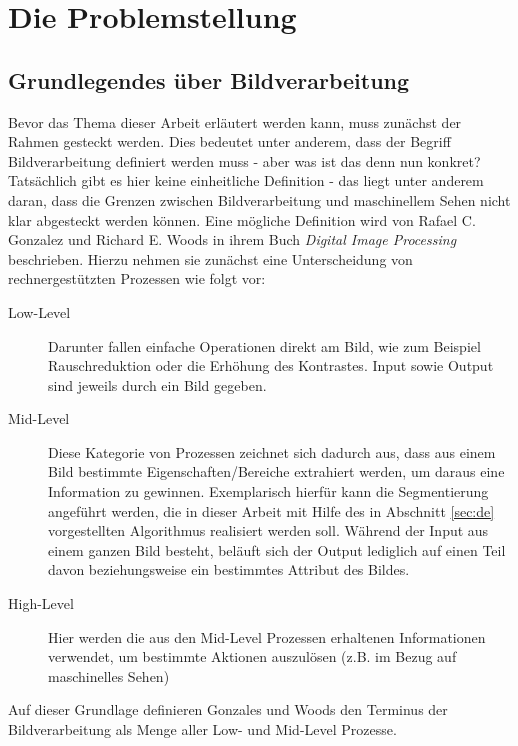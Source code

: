 \chapter{Die Problemstellung}
\label{sec:prob}
	
	\section{Grundlegendes über Bildverarbeitung}
	\label{sec:bild-basics}
	
	Bevor das Thema dieser Arbeit erläutert werden kann, muss zunächst der Rahmen gesteckt werden. Dies bedeutet unter anderem, dass der Begriff Bildverarbeitung definiert werden muss - aber was ist das denn nun konkret? Tatsächlich gibt es hier keine einheitliche Definition - das liegt unter anderem daran, dass die Grenzen zwischen Bildverarbeitung und maschinellem Sehen nicht klar abgesteckt werden können. Eine mögliche Definition wird von Rafael C. Gonzalez und Richard E. Woods in ihrem Buch \textit{Digital Image Processing} \cite[S. 1--3]{gonzalez-woods} beschrieben. Hierzu nehmen sie zunächst eine Unterscheidung von rechnergestützten Prozessen wie folgt vor: 
	
	\begin{description}
		\item[Low-Level] Darunter fallen einfache Operationen direkt am Bild, wie zum Beispiel Rauschreduktion oder die Erhöhung des Kontrastes. Input sowie Output sind jeweils durch ein Bild gegeben.
		\item[Mid-Level] Diese Kategorie von Prozessen zeichnet sich dadurch aus, dass aus einem Bild bestimmte Eigenschaften/Bereiche extrahiert werden, um daraus eine Information zu gewinnen. Exemplarisch hierfür kann die Segmentierung angeführt werden, die in dieser Arbeit mit Hilfe des in Abschnitt \ref{sec:de} vorgestellten Algorithmus realisiert werden soll. Während der Input aus einem ganzen Bild besteht, beläuft sich der Output lediglich auf einen Teil davon beziehungsweise ein bestimmtes Attribut des Bildes.
		\item[High-Level] Hier werden die aus den Mid-Level Prozessen erhaltenen Informationen verwendet, um bestimmte Aktionen auszulösen (z.B. im Bezug auf maschinelles Sehen)
	\end{description}
	
	Auf dieser Grundlage definieren Gonzales und Woods \cite[S. 1--3]{gonzalez-woods} den Terminus der Bildverarbeitung als Menge aller Low- und Mid-Level Prozesse.
	
